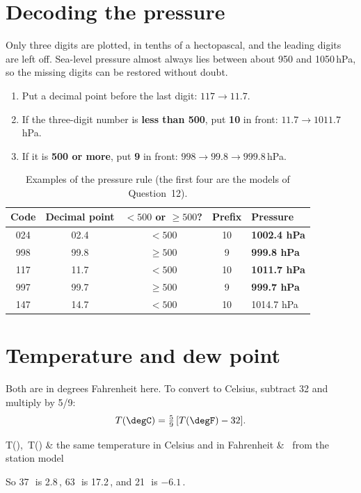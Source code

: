 \section{Decoding the pressure}

Only three digits are plotted, in tenths of a hectopascal, and the leading digits are left off. Sea-level pressure almost always lies between about 950 and 1050\,hPa, so the missing digits can be restored without doubt.

\begin{keybox}
\begin{enumerate}[label=\textbf{\arabic*.},itemsep=2pt]
\item Put a decimal point before the last digit: $117\to11.7$.
\item If the three-digit number is \textbf{less than 500}, put \textbf{10} in front: $11.7\to1011.7$\,hPa.
\item If it is \textbf{500 or more}, put \textbf{9} in front: $998\to99.8\to999.8$\,hPa.
\end{enumerate}
\end{keybox}

\begin{table}[ht]
\centering
\caption{Examples of the pressure rule (the first four are the models of Question~12).}
\begin{tabular}{ccccl}
\toprule
\textbf{Code} & \textbf{Decimal point} & \textbf{$<500$ or $\ge500$?} & \textbf{Prefix} & \textbf{Pressure}\\
\midrule
024 & 02.4 & $<500$ & 10 & \textbf{1002.4 hPa}\\
998 & 99.8 & $\ge500$ & 9 & \textbf{999.8 hPa}\\
117 & 11.7 & $<500$ & 10 & \textbf{1011.7 hPa}\\
997 & 99.7 & $\ge500$ & 9 & \textbf{999.7 hPa}\\
147 & 14.7 & $<500$ & 10 & 1014.7 hPa\\
\bottomrule
\end{tabular}
\end{table}

\section{Temperature and dew point}

Both are in degrees Fahrenheit here. To convert to Celsius, subtract 32 and multiply by 5/9:
\begin{equation}
T(\degC)=\tfrac{5}{9}\,[T(\degF)-32].\label{p3-eq:ftoc}
\end{equation}
\begin{where}
T(\degC),\ T(\degF) & the same temperature in Celsius and in Fahrenheit & \degF\ from the station model\\
\end{where}
So 37\,\degF\ is 2.8\,\degC, 63\,\degF\ is 17.2\,\degC, and 21\,\degF\ is $-6.1$\,\degC.

